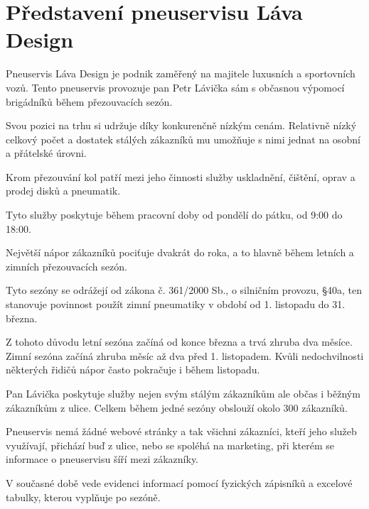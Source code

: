 \section{Představení pneuservisu Láva Design}
Pneuservis Láva Design je podnik zaměřený na majitele luxusních a sportovních vozů. Tento pneuservis provozuje pan Petr Lávička sám s občasnou výpomocí brigádníků během přezouvacích sezón. 

Svou pozici na trhu si udržuje díky konkurenčně nízkým cenám. Relativně nízký celkový počet a dostatek stálých zákazníků mu umožňuje s nimi jednat na osobní a přátelské úrovni.

Krom přezouvání kol patří mezi jeho činnosti služby uskladnění, čištění, oprav a prodej disků a pneumatik. 

Tyto služby poskytuje během pracovní doby od pondělí do pátku, od 9:00 do 18:00.

Největší nápor zákazníků pociťuje dvakrát do roka, a to hlavně během letních a zimních přezouvacích sezón. 

Tyto sezóny se odrážejí od zákona č. 361/2000 Sb., o silničním provozu, §40a, ten stanovuje povinnost použít zimní pneumatiky v období od 1. listopadu do 31. března.

Z tohoto důvodu letní sezóna začíná od konce března a trvá zhruba dva měsíce. Zimní sezóna začíná zhruba měsíc až dva před 1. listopadem. Kvůli nedochvilnosti některých řidičů nápor často pokračuje i během listopadu.

Pan Lávička poskytuje služby nejen svým stálým zákazníkům ale občas i běžným zákazníkům z ulice. Celkem během jedné sezóny obslouží okolo 300 zákazníků.

Pneuservis nemá žádné webové stránky a tak všichni zákazníci, kteří jeho služeb využívají, přichází buď z ulice, nebo se spoléhá na  marketing, při kterém se informace o pneuservisu šíří mezi zákazníky.

V současné době vede evidenci informací pomocí fyzických zápisníků a excelové tabulky, kterou vyplňuje po sezóně.
